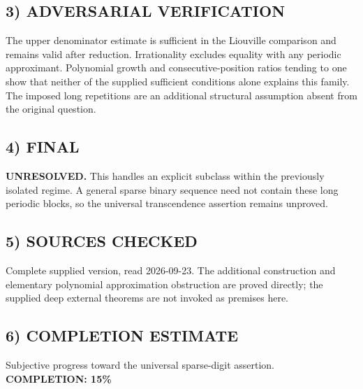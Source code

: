 \subsection*{3) ADVERSARIAL VERIFICATION}
The upper denominator estimate is sufficient in the Liouville comparison and remains valid after reduction. Irrationality excludes equality with any periodic approximant. Polynomial growth and consecutive-position ratios tending to one show that neither of the supplied sufficient conditions alone explains this family. The imposed long repetitions are an additional structural assumption absent from the original question.
\subsection*{4) FINAL}
\textbf{UNRESOLVED.} This handles an explicit subclass within the previously isolated regime. A general sparse binary sequence need not contain these long periodic blocks, so the universal transcendence assertion remains unproved.
\subsection*{5) SOURCES CHECKED}
Complete supplied version, read 2026-09-23. The additional construction and elementary polynomial approximation obstruction are proved directly; the supplied deep external theorems are not invoked as premises here.
\subsection*{6) COMPLETION ESTIMATE}
Subjective progress toward the universal sparse-digit assertion.
\textbf{COMPLETION: 15\%}

